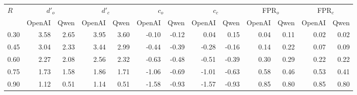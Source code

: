 \begin{tabular}{l*{12}{r}}
\toprule
  \multirow{2}{*}{$R$} & \multicolumn{2}{c}{$d'_o$} & \multicolumn{2}{c}{$d'_c$} & \multicolumn{2}{c}{$c_o$} & \multicolumn{2}{c}{$c_c$} & \multicolumn{2}{c}{FPR$_o$} & \multicolumn{2}{c}{FPR$_c$} \\
  \cmidrule(lr){2-3} \cmidrule(lr){4-5} \cmidrule(lr){6-7} \cmidrule(lr){8-9} \cmidrule(lr){10-11} \cmidrule(lr){12-13}
  & OpenAI & Qwen & OpenAI & Qwen & OpenAI & Qwen & OpenAI & Qwen & OpenAI & Qwen & OpenAI & Qwen \\
\midrule
  0.30 & 3.58 & 2.65 & 3.95 & 3.60 & -0.10 & -0.12 & 0.04 & 0.15 & 0.04 & 0.11 & 0.02 & 0.02 \\
  0.45 & 3.04 & 2.33 & 3.44 & 2.99 & -0.44 & -0.39 & -0.28 & -0.16 & 0.14 & 0.22 & 0.07 & 0.09 \\
  0.60 & 2.27 & 2.08 & 2.56 & 2.32 & -0.63 & -0.48 & -0.51 & -0.39 & 0.30 & 0.29 & 0.22 & 0.22 \\
  0.75 & 1.73 & 1.58 & 1.86 & 1.71 & -1.06 & -0.69 & -1.01 & -0.63 & 0.58 & 0.46 & 0.53 & 0.41 \\
  0.90 & 1.12 & 0.51 & 1.14 & 0.51 & -1.58 & -0.93 & -1.57 & -0.93 & 0.85 & 0.80 & 0.85 & 0.80 \\
\bottomrule
\end{tabular}
